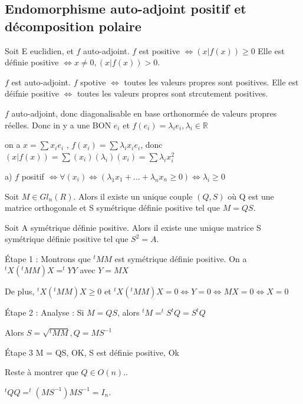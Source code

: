 \documentclass[french]{yLectureNote}
\newcommand{\R}[0]{\mathbb{R}}
\begin{document}
\subsection{Endomorphisme auto-adjoint positif et décomposition polaire}
\begin{definition}
    Soit E euclidien, et $f$ auto-adjoint. $f$ est positive $\iff (x|f(x))\geq 0$ Elle est définie positive $\iff x\neq 0 , (x|f(x))>0$.
\end{definition}
\begin{proposition}
    $f$ est auto-adjoint. $f$ spotive $\iff$ toutes les valeurs propres sont positives. Elle est déifnie positive $\iff$ toutes les valeurs propres sont strcutement positives.
\end{proposition}
\begin{myproof}
    $f$ auto-adjoint, donc diagonalisable en base orthonormée de valeurs propres réelles. Donc in y a une BON $e_i$ et $f(e_i) = \lambda_i e_i, \lambda_i \in \R$

    on  a $x= \sum x_i e_i$ , $f(x_i) = \sum \lambda_i x_i e_i$, donc $(x|f(x)) = \sum (x_i)(\lambda_i)(x_i) = \sum \lambda_i x_i^2$

    a) $f$ positif $\iff \forall(x_i) \iff (\lambda_1 x_1+\dots+\lambda_n x_n\geq 0)\iff \lambda_i \geq 0$
\end{myproof}
\begin{theorem}
    Soit $M\in Gl_n(R)$. Alors il existe un unique couple $(Q,S)$ où Q est une matrice orthogonale et S symétrique définie positive tel que $M=QS$.
\end{theorem}
\begin{lemma}
    Soit A symétrique  définie positive. Alors il existe une unique matrice S symétrique définie positive tel que $S^2=A$.
\end{lemma}
\begin{myproof}[Théorème]
    Étape 1 : Montrons que $^tMM$ est symétrique définie positive.
On a $^tX(^tMM)X = ^tYY$ avec $Y = MX$

De plus, $^tX(^tMM)X \geq 0$
et $^tX(^tMM)X = 0 \iff Y = 0 \iff MX = 0 \iff X = 0$

Étape 2 : Analyse :
Si $M=QS$, alors $^tM = ^tS^tQ = S^tQ$

Alors $S = \sqrt{^tMM}, Q = MS^{-1}$

Étape 3
M = QS, OK, S est définie positive, Ok 

Reste à montrer que $Q \in O(n)$..

$^tQQ = ^t(MS^{-1})MS^{-1} = I_n$.
\end{myproof}
\end{document}
